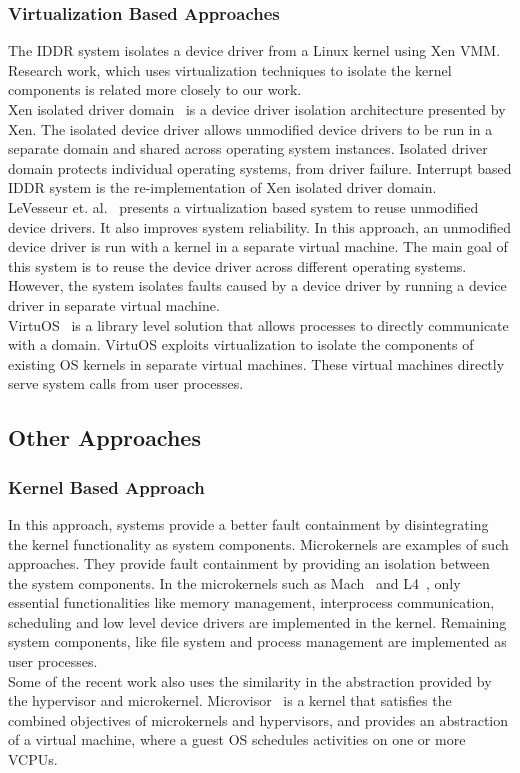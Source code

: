 \subsubsection*{Virtualization Based Approaches}
The IDDR system isolates a device driver from a Linux kernel using Xen VMM. Research work, which uses virtualization techniques to isolate the kernel components is related more closely to our work.
\\[3mm]
Xen isolated driver domain~\cite{Fraser04safehardware} is a device driver isolation architecture presented by Xen. The isolated device driver allows unmodified device drivers to be run in a separate domain and shared across operating system instances. Isolated driver domain protects individual operating systems, from driver failure. Interrupt based IDDR system is the re-implementation of Xen isolated driver domain. 
\\[3mm]
LeVesseur et. al.~\cite{LeVasseur04UnmodifiedDriverReuse} presents a virtualization based system to reuse unmodified device drivers. It also improves system reliability. In this approach, an unmodified device driver is run with a kernel in a separate virtual machine. The main goal of this system is to reuse the device driver across different operating systems. However, the system isolates faults caused by a device driver by running a device driver in separate virtual machine.
\\[3mm]
VirtuOS~\cite{Nikolaev:2013:VOS:2517349.2522719} is a library level solution that allows processes to directly communicate with a domain. VirtuOS exploits
virtualization to isolate the components of existing OS kernels in separate virtual machines. These virtual machines directly serve system calls from
user processes.

\subsection{Other Approaches}
\subsubsection*{Kernel Based Approach}
In this approach, systems provide a better fault containment by disintegrating the kernel functionality as system components. Microkernels are examples of such approaches. They provide fault containment by providing an isolation between the system components. In the microkernels such as Mach~\cite{Accetta+:usenix86} and L4~\cite{Liedtke+:sosp95}, only essential functionalities like memory management, interprocess communication, scheduling and low level device drivers are implemented in the kernel. Remaining system components, like file system and process management are implemented as user processes.
\\[3mm]
Some of the recent work also uses the similarity in the abstraction provided by the hypervisor and microkernel. Microvisor~\cite{Heiser+:acm10} is a kernel that satisfies the combined objectives of microkernels and hypervisors, and provides an abstraction of a virtual machine, where a guest OS schedules activities on one or more VCPUs.

